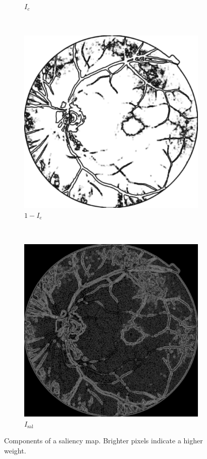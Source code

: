 \documentclass{scrartcl}
\begin{document}
\begin{figure}[htb]
\begin{subfigure}{0.25\textwidth}
    \caption{$I_c$}
\end{subfigure}~
\begin{subfigure}{0.25\textwidth}
\centering
    \includegraphics[width=1\textwidth]{saliency_entropy}
    \caption{$1 - I_e$}
\end{subfigure}~
\begin{subfigure}{0.25\textwidth}
\centering
    \includegraphics[width=1\textwidth]{saliency_full}
    \caption{$I_{\text{sal}}$}
\end{subfigure}

\caption{Components of a saliency map.
Brighter pixels indicate a higher weight.}
\label{fig:saliency}
\end{figure}
\end{document}
